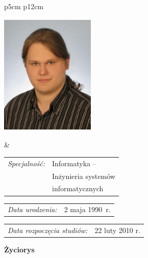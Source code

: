 \begin{titlepage}
    \newpage\thispagestyle{empty}
    \begin{tabular}{p{5cm} p{12cm}}
    \begin{minipage}{5cm}
    \center
    \includegraphics[height=5.8cm,width=4.5cm]{img/foto.jpg}
    \end{minipage}
    &
    \begin{minipage}{12cm}
    \begin{flushleft}
    \par\noindent\vspace{1\baselineskip}
    \begin{tabular}[h]{l l}
    {\normalsize\it Specjalność:} & Informatyka -- \\
    & Inżynieria systemów \\
    & informatycznych \\
    \end{tabular}
    \par\noindent\vspace{1\baselineskip}
    \begin{tabular}[h]{l l}
    {\normalsize\it Data urodzenia:} & {\normalsize 2 maja 1990~r.}
    \end{tabular}
    \par\noindent\vspace{1\baselineskip}
    \begin{tabular}[h]{l l}
    {\normalsize\it Data rozpoczęcia studiów:} & {\normalsize 22 luty 2010 r.}
    \end{tabular}
    \par\noindent\vspace{1\baselineskip}
    \end{flushleft}
    \end{minipage}
    \end{tabular}
    \vspace*{1\baselineskip}
    \begin{center}
	{\large\bfseries Życiorys}\par\bigskip
    \end{center}


\end{titlepage}
